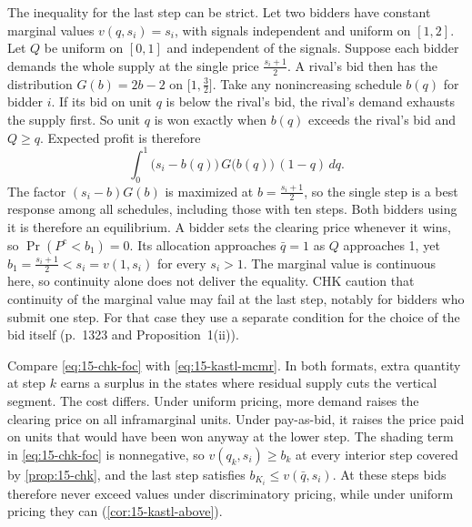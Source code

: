 The inequality for the last step can be strict. Let two bidders have constant marginal values
$v(q,s_i)=s_i$, with signals independent and uniform on $[1,2]$. Let $Q$ be uniform on $[0,1]$ and
independent of the signals. Suppose each bidder demands the whole supply at the single price
$\frac{s_i+1}{2}$. A rival's bid then has the distribution $G(b)=2b-2$ on $\bigl[1,\frac32\bigr]$. Take
any nonincreasing schedule $b(q)$ for bidder $i$. If its bid on unit $q$ is below the rival's bid, the
rival's demand exhausts the supply first. So unit $q$ is won exactly when $b(q)$ exceeds the rival's bid
and $Q\ge q$. Expected profit is therefore
\[
\int_0^1\bigl(s_i-b(q)\bigr)\,G\bigl(b(q)\bigr)\,(1-q)\,dq .
\]
The factor $(s_i-b)G(b)$ is maximized at $b=\frac{s_i+1}{2}$, so the single step is a best response
among all schedules, including those with ten steps. Both bidders using it is therefore an equilibrium. A
bidder sets the clearing price whenever it wins, so $\Pr(P^{\mathrm c}<b_1)=0$. Its allocation approaches
$\bar q=1$ as $Q$ approaches 1, yet $b_1=\frac{s_i+1}{2}<s_i=v(1,s_i)$ for every $s_i>1$. The marginal
value is continuous here, so continuity alone does not deliver the equality. CHK caution that continuity of
the marginal value may fail at the last step, notably for bidders who submit one step. For that case they
use a separate condition for the choice of the bid itself (p.~1323 and Proposition~1(ii)).

Compare \eqref{eq:15-chk-foc} with \eqref{eq:15-kastl-mcmr}. In both formats, extra quantity at step $k$ earns
a surplus in the states where residual supply cuts the vertical segment. The cost differs. Under uniform
pricing, more demand raises the clearing price on all inframarginal units. Under pay-as-bid, it raises the
price paid on units that would have been won anyway at the lower step. The shading term in
\eqref{eq:15-chk-foc} is nonnegative, so $v(q_k,s_i)\ge b_k$ at every interior step covered by \cref{prop:15-chk}, and the last step
satisfies $b_{K_i}\le v(\bar q,s_i)$. At these steps bids therefore never exceed values under discriminatory pricing, while under uniform pricing they can (\cref{cor:15-kastl-above}).

